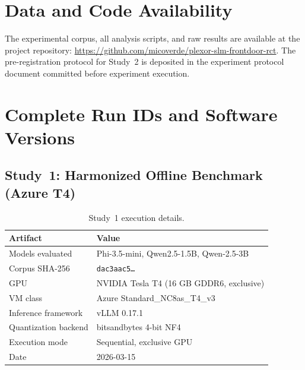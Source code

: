 \documentclass{article}
\begin{document}
\section*{Data and Code Availability}

The experimental corpus, all analysis scripts, and raw results are available at the project repository: \url{https://github.com/micoverde/plexor-slm-frontdoor-rct}. The pre-registration protocol for Study~2 is deposited in the experiment protocol document committed before experiment execution.

\clearpage


\appendix

\section{Complete Run IDs and Software Versions}
\label{app:runids}

\subsection{Study~1: Harmonized Offline Benchmark (Azure T4)}

\begin{table}[htbp]
\centering
\caption{Study~1 execution details.}
\label{tab:study1-runids}
\begin{tabular}{ll}
\toprule
Artifact & Value \\
\midrule
Models evaluated & Phi-3.5-mini, Qwen2.5-1.5B, Qwen-2.5-3B \\
Corpus SHA-256 & \texttt{dac3aac5\ldots} \\
GPU & NVIDIA Tesla T4 (16 GB GDDR6, exclusive) \\
VM class & Azure Standard\_NC8as\_T4\_v3 \\
Inference framework & vLLM 0.17.1 \\
Quantization backend & bitsandbytes 4-bit NF4 \\
Execution mode & Sequential, exclusive GPU \\
Date & 2026-03-15 \\
\bottomrule
\end{tabular}
\end{table}
\end{document}
